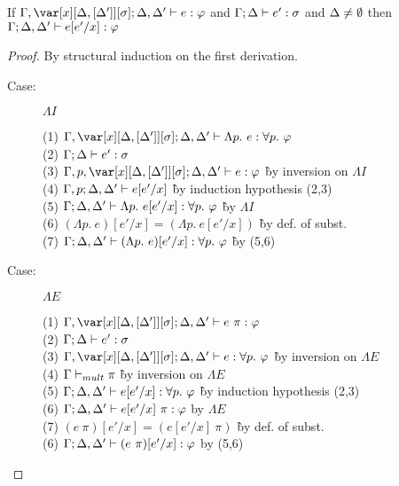 
\begin{lemma}
If $\G,\xD; \D, \D' \vdash e : \varphi$ and $\Gamma; \Delta \vdash e' : \sigma$ and $\Delta \neq \emptyset$ then $\Gamma; \Delta, \Delta' \vdash e[e'/x] : \varphi$
\end{lemma}
\begin{proof}
By structural induction on the first derivation.

\begin{description}

\item[Case:] $\Lambda I$
\begin{tabbing}
    (1) $\G, \xD; \D, \D' \vdash \Lambda p.~e : \forall p.~\vp$\\
    (2) $\Gamma; \Delta \vdash e' : \sigma$\\
    (3) $\G, p, \xD; \D, \D' \vdash e : \vp$ \` by inversion on $\Lambda I$\\
    (4) $\Gamma, p; \Delta, \Delta' \vdash e[e'/x]$ \` by induction hypothesis (2,3)\\
    (5) $\Gamma; \Delta, \Delta' \vdash \Lambda p.~e[e'/x] : \forall p.~\varphi$ \` by $\Lambda I$ \\
    (6) $(\Lambda p.~e)[e'/x] = (\Lambda p.~e[e'/x])$ \` by def. of subst.\\
    (7) $\Gamma; \Delta, \Delta' \vdash (\Lambda p.~e)[e'/x] : \forall p.~\varphi$ \` by (5,6)\\
\end{tabbing}

\item[Case:] $\Lambda E$
\begin{tabbing}
    (1) $\G,\xD; \D,\D' \vdash e~\pi : \vp$\\
    (2) $\Gamma; \Delta \vdash e' : \sigma$\\
    (3) $\G,\xD; \D, \D' \vdash e : \forall p.~\vp$ \` by inversion on $\Lambda E$\\
    (4) $\Gamma \vdash_{mult} \pi$ \` by inversion on $\Lambda E$\\
    (5) $\Gamma; \Delta, \Delta' \vdash e[e'/x] : \forall p.~\varphi$ \` by induction hypothesis (2,3)\\
    (6) $\Gamma; \Delta, \Delta' \vdash e[e'/x]~\pi : \varphi$ by $\Lambda E$\\
    (7) $(e~\pi)[e'/x] = (e[e'/x]~\pi)$ \` by def. of subst.\\
    (6) $\Gamma; \Delta, \Delta' \vdash (e~\pi)[e'/x] : \varphi$ by (5,6)\\
\end{tabbing}


\end{description}
\end{proof}
